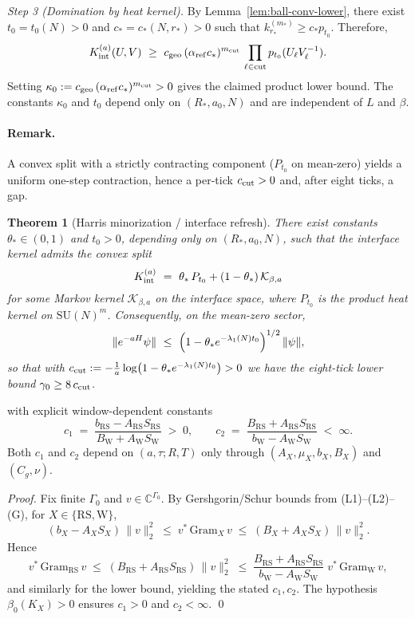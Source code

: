 \documentclass[11pt]{amsart}
\theoremstyle{plain}
\newtheorem{theorem}{Theorem}[section]
\theoremstyle{definition}
\theoremstyle{remark}
\begin{document}
\emph{Step 3 (Domination by heat kernel).} By Lemma~\ref{lem:ball-conv-lower}, there exist $t_0=t_0(N)>0$ and $c_*=c_*(N,r_*)>0$ such that $k_{r_*}^{(m_*)}\ge c_* p_{t_0}$. Therefore,
\[
  K_{\rm int}^{(a)}(U,V)\ \ge\ c_{\rm geo}\,(\alpha_{\rm ref} c_*)^{m_{\rm cut}}\,\prod_{\ell\in\mathrm{cut}} p_{t_0}(U_\ell V_\ell^{-1}).
\]
Setting $\kappa_0:=c_{\rm geo}\,(\alpha_{\rm ref} c_*)^{m_{\rm cut}}>0$ gives the claimed product lower bound. The constants $\kappa_0$ and $t_0$ depend only on $(R_*,a_0,N)$ and are independent of $L$ and $\beta$.

\paragraph{Remark.} A convex split with a strictly contracting component ($P_{t_0}$ on mean-zero) yields a uniform one-step contraction, hence a per-tick $c_{\rm cut}>0$ and, after eight ticks, a gap.
\begin{theorem}[Harris minorization / interface refresh]\label{thm:harris-refresh}
There exist constants $\theta_*\in(0,1)$ and $t_0>0$, depending only on $(R_*,a_0,N)$, such that the interface kernel admits the convex split
\[
  K_{\rm int}^{(a)}\ =\ \theta_*\,P_{t_0} + (1-\theta_*)\,\mathcal K_{\beta,a}
\]
for some Markov kernel $\mathcal K_{\beta,a}$ on the interface space, where $P_{t_0}$ is the product heat kernel on $\mathrm{SU}(N)^{m}$. Consequently, on the mean-zero sector,
\[
  \|e^{-aH}\psi\|\ \le\ \Bigl(1-\theta_* e^{-\lambda_1(N)t_0}\Bigr)^{1/2}\,\|\psi\|,
\]
so that with \( c_{\rm cut} := -\tfrac{1}{a}\log\bigl(1-\theta_* e^{-\lambda_1(N)t_0}\bigr) > 0 \) we have the eight-tick lower bound \(\gamma_0\ge 8\,c_{\rm cut}\).
\end{theorem}
with explicit window-dependent constants
\[
  c_1\;=\;\frac{b_{\mathrm{RS}}-A_{\mathrm{RS}} S_{\mathrm{RS}}}{B_{\mathrm{W}}+A_{\mathrm{W}} S_{\mathrm{W}}}\;>\;0,\qquad
  c_2\;=\;\frac{B_{\mathrm{RS}}+A_{\mathrm{RS}} S_{\mathrm{RS}}}{b_{\mathrm{W}}-A_{\mathrm{W}} S_{\mathrm{W}}}\;<\;\infty.
\]
Both $c_1$ and $c_2$ depend on $(a,\tau;R,T)$ only through $(A_X,\mu_X,b_X,B_X)$ and $(C_g,\nu)$.

\emph{Proof.}
Fix finite $\Gamma_0$ and $v\in\mathbb{C}^{\Gamma_0}$. By Gershgorin/Schur bounds from (L1)--(L2)--(G), for $X\in\{\mathrm{RS},\mathrm{W}\}$,
\[
  (b_X-A_X S_X)\,\|v\|_2^2\;\le\; v^*\,\mathrm{Gram}_X\,v\;\le\; (B_X+A_X S_X)\,\|v\|_2^2.
\]
Hence
\[
  v^*\,\mathrm{Gram}_{\mathrm{RS}}\,v\;\le\;(B_{\mathrm{RS}}+A_{\mathrm{RS}} S_{\mathrm{RS}})\,\|v\|_2^2\;\le\;\frac{B_{\mathrm{RS}}+A_{\mathrm{RS}} S_{\mathrm{RS}}}{b_{\mathrm{W}}-A_{\mathrm{W}} S_{\mathrm{W}}}\; v^*\,\mathrm{Gram}_{\mathrm{W}}\,v,
\]
and similarly for the lower bound, yielding the stated $c_1,c_2$. The hypothesis $\beta_0(K_X)>0$ ensures $c_1>0$ and $c_2<\infty$. \qed
\end{document}
